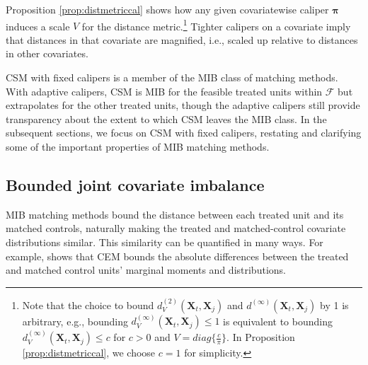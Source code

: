 \documentclass{article}
\newcommand{\Xt}{\mathbf{X}_t}
\newcommand{\Xj}{\mathbf{X}_j}
\begin{document}
Proposition \ref{prop:distmetriccal} shows how any given covariatewise caliper $\boldsymbol{\pi}$ induces a scale $V$ for the distance metric.\footnote{Note that the choice to bound $d^{(2)}_V(\Xt, \Xj)$ and $d^{(\infty)}(\Xt, \Xj)$ by 1 is arbitrary, e.g.,
bounding $d^{(\infty)}_V(\Xt, \Xj) \leq 1$ is equivalent to bounding $d^{(\infty)}_V(\Xt, \Xj) \leq c$ for $c>0$ and $V = diag\{\frac{c}{\pi}\}$.
In Proposition \ref{prop:distmetriccal}, we choose $c=1$ for simplicity.}
Tighter calipers on a covariate imply that distances in that covariate are magnified, i.e., scaled up relative to distances in other covariates.


CSM with fixed calipers is a member of the MIB class of matching methods.
With adaptive calipers, CSM is MIB for the feasible treated units within $\mathcal{F}$ but extrapolates for the other treated units,
though the adaptive calipers still provide transparency about the extent to which CSM leaves the MIB class.
In the subsequent sections, we focus on CSM with fixed calipers, restating and clarifying some of the important properties of MIB matching methods.


\subsection{Bounded joint covariate imbalance}

MIB matching methods bound the distance between each treated unit and its matched controls, naturally making the treated and matched-control covariate distributions similar.
This similarity can be quantified in many ways.
For example, \citet{iacus2012causal} shows that CEM bounds the absolute differences between the treated and matched control units' marginal moments and distributions.
\end{document}
